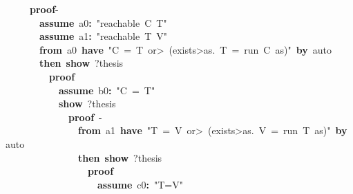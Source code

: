 \documentclass{article}
\newcommand{\syntaxKEYWORDA}[1]{\textcolor[rgb]{0.0,0.4,0.6}{\textbf{#1}}}
\newcommand{\syntaxKEYWORDC}[1]{\textcolor[rgb]{0.0,0.6,1.0}{\textbf{#1}}}
\newcommand{\syntaxLITERALA}[1]{\textcolor[rgb]{1.0,0.0,0.8}{#1}}
\newcommand{\syntaxOPERATOR}[1]{\textcolor[rgb]{0.0,0.0,0.0}{\textbf{#1}}}
\newcommand{\syntaxKEYWORDA}[1]{\textcolor[rgb]{0.0,0.4,0.6}{\textbf{#1}}}
\newcommand{\syntaxKEYWORDC}[1]{\textcolor[rgb]{0.0,0.6,1.0}{\textbf{#1}}}
\newcommand{\syntaxLITERALA}[1]{\textcolor[rgb]{1.0,0.0,0.8}{#1}}
\newcommand{\syntaxOPERATOR}[1]{\textcolor[rgb]{0.0,0.0,0.0}{\textbf{#1}}}
\newcommand{\syntaxKEYWORDA}[1]{\textcolor[rgb]{0.0,0.4,0.6}{\textbf{#1}}}
\newcommand{\syntaxKEYWORDC}[1]{\textcolor[rgb]{0.0,0.6,1.0}{\textbf{#1}}}
\newcommand{\syntaxLITERALA}[1]{\textcolor[rgb]{1.0,0.0,0.8}{#1}}
\newcommand{\syntaxOPERATOR}[1]{\textcolor[rgb]{0.0,0.0,0.0}{\textbf{#1}}}
\newcommand{\syntaxKEYWORDA}[1]{\textcolor[rgb]{0.0,0.4,0.6}{#1}}
\newcommand{\syntaxKEYWORDC}[1]{\textcolor[rgb]{0.0,0.6,1.0}{#1}}
\newcommand{\syntaxLITERALA}[1]{\textcolor[rgb]{1.0,0.0,0.8}{\textbf{#1}}}
\newcommand{\syntaxOPERATOR}[1]{\textcolor[rgb]{0.0,0.0,0.0}{#1}}
\newcommand{\syntaxKEYWORDA}[1]{\textcolor[rgb]{0.0,0.4,0.6}{\textbf{#1}}}
\newcommand{\syntaxKEYWORDC}[1]{\textcolor[rgb]{0.0,0.6,1.0}{\textbf{#1}}}
\newcommand{\syntaxLITERALA}[1]{\textcolor[rgb]{1.0,0.0,0.8}{#1}}
\newcommand{\syntaxOPERATOR}[1]{\textcolor[rgb]{0.0,0.0,0.0}{\textbf{#1}}}
\newcommand{\syntaxKEYWORDA}[1]{\textcolor[rgb]{0.0,0.4,0.6}{\textbf{#1}}}
\newcommand{\syntaxKEYWORDC}[1]{\textcolor[rgb]{0.0,0.6,1.0}{\textbf{#1}}}
\newcommand{\syntaxLITERALA}[1]{\textcolor[rgb]{1.0,0.0,0.8}{#1}}
\newcommand{\syntaxOPERATOR}[1]{\textcolor[rgb]{0.0,0.0,0.0}{\textbf{#1}}}
\begin{document}
{\ }{\ }{\ }{\ }{\ }{\ }\syntaxKEYWORDA{proof}{-}\hspace*{\fill}\\
{\ }{\ }{\ }{\ }{\ }{\ }{\ }{\ }\syntaxKEYWORDC{assume}{\ }a0\syntaxOPERATOR{:}{\ }\syntaxLITERALA{"reachable{\ }C{\ }T"}\hspace*{\fill}\\
{\ }{\ }{\ }{\ }{\ }{\ }{\ }{\ }\syntaxKEYWORDC{assume}{\ }a1\syntaxOPERATOR{:}{\ }\syntaxLITERALA{"reachable{\ }T{\ }V"}\hspace*{\fill}\\
{\ }{\ }{\ }{\ }{\ }{\ }{\ }{\ }\syntaxKEYWORDA{from}{\ }a0{\ }\syntaxKEYWORDA{have}{\ }\syntaxLITERALA{"C{\ }={\ }T{\ }\<or>{\ }(\<exists>as.{\ }T{\ }={\ }run{\ }C{\ }as)"}{\ }\syntaxKEYWORDA{by}{\ }auto\hspace*{\fill}\\
{\ }{\ }{\ }{\ }{\ }{\ }{\ }{\ }\syntaxKEYWORDA{then}{\ }\syntaxKEYWORDC{show}{\ }?thesis\hspace*{\fill}\\
{\ }{\ }{\ }{\ }{\ }{\ }{\ }{\ }{\ }{\ }\syntaxKEYWORDA{proof}\hspace*{\fill}\\
{\ }{\ }{\ }{\ }{\ }{\ }{\ }{\ }{\ }{\ }{\ }{\ }\syntaxKEYWORDC{assume}{\ }b0\syntaxOPERATOR{:}{\ }\syntaxLITERALA{"C{\ }={\ }T"}\hspace*{\fill}\\
{\ }{\ }{\ }{\ }{\ }{\ }{\ }{\ }{\ }{\ }{\ }{\ }\syntaxKEYWORDC{show}{\ }?thesis{\ }\hspace*{\fill}\\
{\ }{\ }{\ }{\ }{\ }{\ }{\ }{\ }{\ }{\ }{\ }{\ }{\ }{\ }\syntaxKEYWORDA{proof}{\ }{-}\hspace*{\fill}\\
{\ }{\ }{\ }{\ }{\ }{\ }{\ }{\ }{\ }{\ }{\ }{\ }{\ }{\ }{\ }{\ }\syntaxKEYWORDA{from}{\ }a1{\ }\syntaxKEYWORDA{have}{\ }\syntaxLITERALA{"T{\ }={\ }V{\ }\<or>{\ }(\<exists>as.{\ }V{\ }={\ }run{\ }T{\ }as)"}{\ }\syntaxKEYWORDA{by}{\ }auto\hspace*{\fill}\\
{\ }{\ }{\ }{\ }{\ }{\ }{\ }{\ }{\ }{\ }{\ }{\ }{\ }{\ }{\ }{\ }\syntaxKEYWORDA{then}{\ }\syntaxKEYWORDC{show}{\ }?thesis\hspace*{\fill}\\
{\ }{\ }{\ }{\ }{\ }{\ }{\ }{\ }{\ }{\ }{\ }{\ }{\ }{\ }{\ }{\ }{\ }{\ }\syntaxKEYWORDA{proof}\hspace*{\fill}\\
{\ }{\ }{\ }{\ }{\ }{\ }{\ }{\ }{\ }{\ }{\ }{\ }{\ }{\ }{\ }{\ }{\ }{\ }{\ }{\ }\syntaxKEYWORDC{assume}{\ }c0\syntaxOPERATOR{:}{\ }\syntaxLITERALA{"T=V"}\hspace*{\fill}\\
\end{document}
